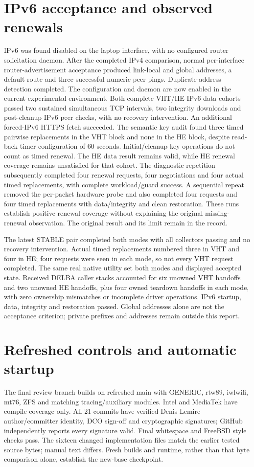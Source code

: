 \documentclass[11pt,letterpaper,oneside]{article}
\begin{document}
\section{IPv6 acceptance and observed renewals}
IPv6 was found disabled on the laptop interface, with no configured router solicitation daemon. After the completed IPv4 comparison, normal per-interface router-advertisement acceptance produced link-local and global addresses, a default route and three successful numeric peer pings. Duplicate-address detection completed. The configuration and daemon are now enabled in the current experimental environment. Both complete VHT/HE IPv6 data cohorts passed two sustained simultaneous TCP intervals, two integrity downloads and post-cleanup IPv6 peer checks, with no recovery intervention. An additional forced-IPv6 HTTPS fetch succeeded. The semantic key audit found three timed pairwise replacements in the VHT block and none in the HE block, despite read-back timer configuration of 60 seconds. Initial/cleanup key operations do not count as timed renewal. The HE data result remains valid, while HE renewal coverage remains unsatisfied for that cohort. The diagnostic repetition subsequently completed four renewal requests, four negotiations and four actual timed replacements, with complete workload/guard success. A sequential repeat removed the per-packet hardware probe and also completed four requests and four timed replacements with data/integrity and clean restoration. These runs establish positive renewal coverage without explaining the original missing-renewal observation. The original result and its limit remain in the record.

The latest STABLE pair completed both modes with all collectors passing and no recovery intervention. Actual timed replacements numbered three in VHT and four in HE; four requests were seen in each mode, so not every VHT request completed. The same real native utility set both modes and displayed accepted state. Received DELBA caller stacks accounted for six unowned VHT handoffs and two unowned HE handoffs, plus four owned teardown handoffs in each mode, with zero ownership mismatches or incomplete driver operations. IPv6 startup, data, integrity and restoration passed. Global addresses alone are not the acceptance criterion; private prefixes and addresses remain outside this report.

\section{Refreshed controls and automatic startup}
The final review branch builds on refreshed main with GENERIC, rtw89, iwlwifi, mt76, ZFS and matching tracing/auxiliary modules. Intel and MediaTek have compile coverage only. All 21 commits have verified Denis Lemire author/committer identity, DCO sign-off and cryptographic signatures; GitHub independently reports every signature valid. Final whitespace and FreeBSD style checks pass. The sixteen changed implementation files match the earlier tested source bytes; manual text differs. Fresh builds and runtime, rather than that byte comparison alone, establish the new-base checkpoint.
\end{document}
